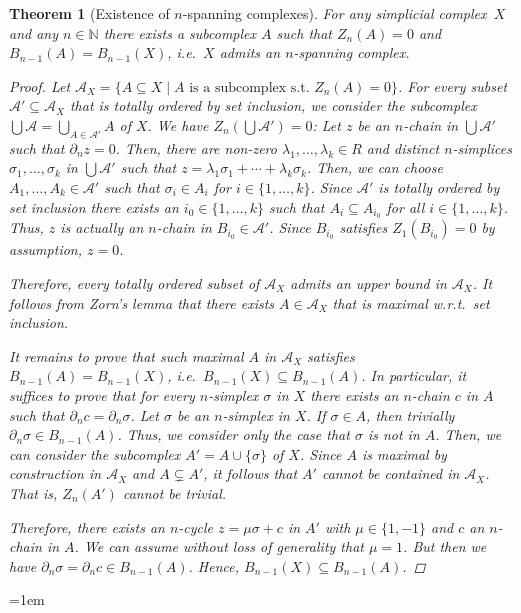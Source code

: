 \documentclass[oneside]{amsart}
\newtheorem{theorem}{Theorem}
\theoremstyle{definition}
\begin{document}
\begin{theorem}[Existence of $n$-spanning complexes]%
    \label{theorem:ExistenceNSS}
    For any simplicial complex~$X$ and any $n \in \mathbb N$ there exists a subcomplex $A$ such that $Z_n(A) = 0$ and $B_{n-1}(A) = B_{n-1}(X)$, i.e.\ $X$ admits an $n$-spanning complex.

    \begin{proof}
        Let $\mathcal A_X = \{ A \subseteq X \mid \text{$A$ is a subcomplex s.t.\ $Z_n(A) = 0$} \}$.
        For every subset $\mathcal A' \subseteq \mathcal A_X$ that is totally ordered by set inclusion, we consider the subcomplex $\bigcup \mathcal A = \bigcup_{A \in \mathcal A'} A$ of $X$.
        We have $Z_n(\bigcup \mathcal A') = 0$:
        Let $z$ be an $n$-chain in $\bigcup \mathcal A'$ such that $\partial_n z = 0$.
        Then, there are non-zero $\lambda_1, \dotsc, \lambda_k \in R$ and distinct $n$-simplices $\sigma_1, \dotsc, \sigma_k$ in $\bigcup \mathcal A'$ such that $z = \lambda_1 \sigma_1 + \dotsb + \lambda_k \sigma_k$.
        Then, we can choose $A_1, \dotsc, A_k \in \mathcal A'$ such that $\sigma_i \in A_i$ for $i \in \{ 1, \dotsc, k \}$.
        Since $\mathcal A'$ is totally ordered by set inclusion there exists an $i_0 \in \{ 1, \dotsc, k \}$ such that $A_i \subseteq A_{i_0}$ for all $i \in \{ 1, \dotsc, k \}$.
        Thus, $z$ is actually an $n$-chain in $B_{i_0} \in \mathcal A'$.
        Since $B_{i_0}$ satisfies $Z_1(B_{i_0}) = 0$ by assumption, $z = 0$.
    
        Therefore, every totally ordered subset of $\mathcal A_X$ admits an upper bound in $\mathcal A_X$.
        It follows from Zorn's lemma that there exists $A \in \mathcal A_X$ that is maximal w.r.t.\ set inclusion.
    
        It remains to prove that such maximal $A$ in $\mathcal A_X$ satisfies $B_{n-1}(A) = B_{n-1}(X)$, i.e.\ $B_{n-1}(X) \subseteq B_{n-1}(A)$.
        In particular, it suffices to prove that for every $n$-simplex $\sigma$ in $X$ there exists an $n$-chain $c$ in $A$ such that $\partial_n c = \partial_n \sigma$.
        Let $\sigma$ be an $n$-simplex in $X$.
        If $\sigma \in A$, then trivially $\partial_n \sigma \in B_{n-1}(A)$.
        Thus, we consider only the case that $\sigma$ is not in $A$.
        Then, we can consider the subcomplex $A' = A \cup \{ \sigma \}$ of $X$.
        Since $A$ is maximal by construction in $\mathcal A_X$ and $A \subsetneq A'$, it follows that $A'$ cannot be contained in $\mathcal A_X$.
        That is, $Z_n(A')$ cannot be trivial.
        
        Therefore, there exists an $n$-cycle $z = \mu \sigma + c$ in $A'$ with $\mu \in \{ 1, -1 \}$ and $c$ an $n$-chain in $A$.
        We can assume without loss of generality that $\mu = 1$.
        But then we have $\partial_n \sigma = \partial_n c \in B_{n-1}(A)$.
        Hence, $B_{n-1}(X) \subseteq B_{n-1}(A)$.
    \end{proof}    
\end{theorem}

\emergencystretch=1em
\printbibliography
\end{document}

